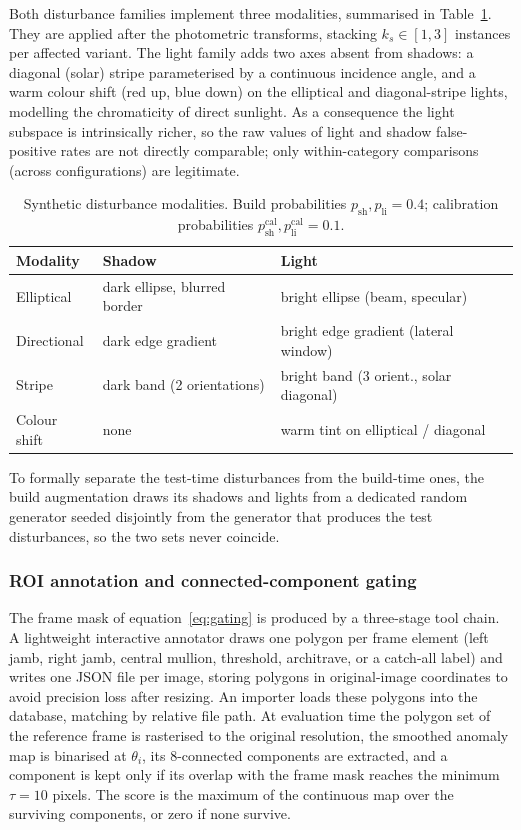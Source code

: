 Both disturbance families implement three modalities, summarised in
Table~\ref{tab:p3-disturb}. They are applied after the photometric transforms,
stacking $k_s \in [1,3]$ instances per affected variant. The light family adds
two axes absent from shadows: a diagonal (solar) stripe parameterised by a
continuous incidence angle, and a warm colour shift (red up, blue down) on the
elliptical and diagonal-stripe lights, modelling the chromaticity of direct
sunlight. As a consequence the light subspace is intrinsically richer, so the
raw values of light and shadow false-positive rates are not directly comparable;
only within-category comparisons (across configurations) are legitimate.

\begin{table}[h]
  \centering
  \begin{tabular}{lll}
    \hline
    Modality & Shadow & Light \\
    \hline
    Elliptical & dark ellipse, blurred border & bright ellipse (beam, specular) \\
    Directional & dark edge gradient & bright edge gradient (lateral window) \\
    Stripe & dark band (2 orientations) & bright band (3 orient., solar diagonal) \\
    Colour shift & none & warm tint on elliptical / diagonal \\
    \hline
  \end{tabular}
  \caption{Synthetic disturbance modalities. Build probabilities
  $p_{\mathrm{sh}}, p_{\mathrm{li}} = 0.4$; calibration probabilities
  $p_{\mathrm{sh}}^{\mathrm{cal}}, p_{\mathrm{li}}^{\mathrm{cal}} = 0.1$.}
  \label{tab:p3-disturb}
\end{table}

To formally separate the test-time disturbances from the build-time ones, the
build augmentation draws its shadows and lights from a dedicated random generator
seeded disjointly from the generator that produces the test disturbances, so the
two sets never coincide.

\subsubsection{ROI annotation and connected-component gating}

The frame mask of equation~\eqref{eq:gating} is produced by a three-stage tool
chain. A lightweight interactive annotator draws one polygon per frame element
(left jamb, right jamb, central mullion, threshold, architrave, or a catch-all
label) and writes one JSON file per image, storing polygons in original-image
coordinates to avoid precision loss after resizing. An importer loads these
polygons into the database, matching by relative file path. At evaluation time
the polygon set of the reference frame is rasterised to the original resolution,
the smoothed anomaly map is binarised at $\theta_i$, its $8$-connected components
are extracted, and a component is kept only if its overlap with the frame mask
reaches the minimum $\tau = 10$ pixels. The score is the maximum of the
continuous map over the surviving components, or zero if none survive.

